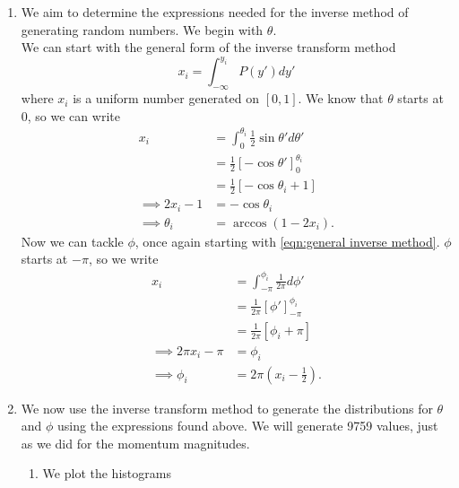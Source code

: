 \documentclass[11pt]{article}
\begin{document}
\begin{enumerate}
\begin{enumerate}
        \item We aim to determine the expressions needed for the inverse method of generating random numbers. We begin with $\theta$.\\
        We can start with the general form of the inverse transform method
        \begin{equation}
            x_i=\int_{-\infty}^{y_i}P(y')dy'
            \label{eqn:general inverse method}
        \end{equation}
        where $x_i$ is a uniform number generated on $[0,1]$. We know that $\theta$ starts at 0, so we can write
        \begin{align*}
            x_i&=\int_0^{\theta_i}\frac 12 \sin\theta' d\theta'\\
            &=\frac 12 \left[-\cos\theta'\right]_0^{\theta_i}\\
            &=\frac 12 [-\cos\theta_i+1]\\
            \implies 2x_i-1&=-\cos\theta_i\\
            \implies \theta_i&=\arccos(1-2x_i).
        \end{align*}
        Now we can tackle $\phi$, once again starting with \cref{eqn:general inverse method}. $\phi$ starts at $-\pi$, so we write
        \begin{align*}
            x_i&=\int_{-\pi}^{\phi_i}\frac{1}{2\pi}d\phi'\\
            &=\frac{1}{2\pi}[\phi']_{-\pi}^{\phi_i}\\
            &=\frac{1}{2\pi}[\phi_i+\pi]\\
            \implies2\pi x_i -\pi&=\phi_i\\
            \implies \phi_i &= 2\pi\left(x_i-\frac 12\right).
        \end{align*}

        \item We now use the inverse transform method to generate the distributions for $\theta$ and $\phi$ using the expressions found above. We will generate \num{9759} values, just as we did for the momentum magnitudes.
        \begin{enumerate}
            \item We plot the histograms
            

\end{enumerate}
\end{enumerate}
\end{enumerate}
\end{document}
